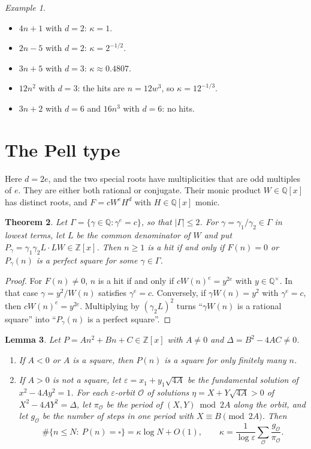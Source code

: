 \documentclass[11pt]{amsart}
\newtheorem{theorem}{Theorem}[section]
\newtheorem{lemma}[theorem]{Lemma}
\theoremstyle{definition}
\theoremstyle{remark}
\newtheorem{example}[theorem]{Example}
\newcommand{\Z}{\mathbb{Z}}
\newcommand{\Q}{\mathbb{Q}}
\begin{document}
\begin{example}
\begin{itemize}
\item $4n+1$ with $d=2$: $\kappa=1$.
\item $2n-5$ with $d=2$: $\kappa=2^{-1/2}$.
\item $3n+5$ with $d=3$: $\kappa\approx0.4807$.
\item $12n^2$ with $d=3$: the hits are $n=12w^3$, so $\kappa=12^{-1/3}$.
\item $3n+2$ with $d=6$ and $16n^3$ with $d=6$: no hits.
\end{itemize}
\end{example}

\section{The Pell type}\label{sec:pell}

Here $d=2e$, and the two special roots have multiplicities that are odd multiples of $e$. They are either both rational or conjugate. Their monic product $W\in\Q[x]$ has distinct roots, and $F=cW^eH^d$ with $H\in\Q[x]$ monic.

\begin{theorem}\label{thm:pellred}
Let $\Gamma=\{\gamma\in\Q:\gamma^e=c\}$, so that $|\Gamma|\le2$. For $\gamma=\gamma_1/\gamma_2\in\Gamma$ in lowest terms, let $L$ be the common denominator of $W$ and put $P_\gamma=\gamma_1\gamma_2L\cdot LW\in\Z[x]$. Then $n\ge1$ is a hit if and only if $F(n)=0$ or $P_\gamma(n)$ is a perfect square for some $\gamma\in\Gamma$.
\end{theorem}

\begin{proof}
For $F(n)\ne0$, $n$ is a hit if and only if $cW(n)^e=y^{2e}$ with $y\in\Q^\times$. In that case $\gamma=y^2/W(n)$ satisfies $\gamma^e=c$. Conversely, if $\gamma W(n)=y^2$ with $\gamma^e=c$, then $cW(n)^e=y^{2e}$. Multiplying by $(\gamma_2L)^2$ turns ``$\gamma W(n)$ is a rational square'' into ``$P_\gamma(n)$ is a perfect square''.
\end{proof}

\begin{lemma}\label{lem:quad}
Let $P=An^2+Bn+C\in\Z[x]$ with $A\ne0$ and $\Delta=B^2-4AC\ne0$.
\begin{enumerate}[label=\textup{(\alph*)}]
\item If $A<0$ or $A$ is a square, then $P(n)$ is a square for only finitely many $n$.
\item If $A>0$ is not a square, let $\varepsilon=x_1+y_1\sqrt{4A}$ be the fundamental solution of $x^2-4Ay^2=1$. For each $\varepsilon$-orbit $\mathcal O$ of solutions $\eta=X+Y\sqrt{4A}>0$ of $X^2-4AY^2=\Delta$, let $\pi_{\mathcal O}$ be the period of $(X,Y)\bmod 2A$ along the orbit, and let $g_{\mathcal O}$ be the number of steps in one period with $X\equiv B\pmod{2A}$. Then
\begin{equation}\label{eq:kappaQ}
\#\{n\le N:\ P(n)=\square\}=\kappa\log N+O(1),\qquad \kappa=\frac{1}{\log\varepsilon}\sum_{\mathcal O}\frac{g_{\mathcal O}}{\pi_{\mathcal O}}.
\end{equation}
\end{enumerate}
\end{lemma}
\end{document}
